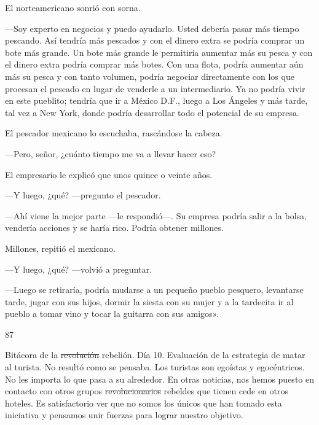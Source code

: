 \documentclass[12pt,twoside,openright,a5paper]{book}
\begin{document}
El norteamericano sonrió con sorna. 

---Soy experto en negocios y puedo
ayudarlo. Usted debería pasar más tiempo pescando. Así tendría más
pescados y con el dinero extra se podría comprar un bote más grande. Un
bote más grande le permitiría aumentar más su pesca y con el dinero
extra podría comprar más botes. Con una flota, podría aumentar aún más su
pesca y con tanto volumen, podría negociar directamente con los que procesan
el pescado en lugar de venderle a un intermediario. Ya no podría vivir en
este pueblito; tendría que ir a México D.F., luego a Los Ángeles y más tarde,
tal vez a New York, donde podría desarrollar todo el potencial de su empresa.

El pescador mexicano lo escuchaba, rascándose la cabeza. 

---Pero, señor, ¿cuánto tiempo me va a llevar hacer eso? 

El empresario le explicó que unos quince o veinte años.

---Y luego, ¿qué? ---pregunto el pescador. 

---Ahí viene la mejor parte ---le respondió---. Su empresa podría salir a la bolsa,
vendería acciones y se haría rico. Podría obtener millones. 

Millones, repitió el mexicano. 

---Y luego, ¿qué? ---volvió a preguntar. 

---Luego se retiraría,
podría mudarse a un pequeño pueblo pesquero, levantarse tarde, jugar con
sus hijos, dormir la siesta con su mujer y a la tardecita ir al pueblo a
tomar vino y tocar la guitarra con sus amigos».

\vspace{0.5cm}

\hrulefill \hspace{0.1cm}\decofourleft\hspace{0.2cm} 87 \hspace{0.2cm}\decofourright \hspace{0.1cm}\hrulefill

\nopagebreak

\vspace{0.5cm}

\nopagebreak

Bitácora de la \st{revolución} rebelión. Día 10. Evaluación de la estrategia de
matar al turista. No resultó como se pensaba. Los turistas son egoístas y
egocéntricos. No les importa lo que pasa a su alrededor. En otras noticias,
nos hemos puesto en contacto con otros grupos \st{revolucionarios}
rebeldes que tienen
cede en otros hoteles. Es satisfactorio ver que no somos los únicos que han
tomado esta iniciativa y pensamos unir fuerzas para lograr nuestro objetivo.
\end{document}

